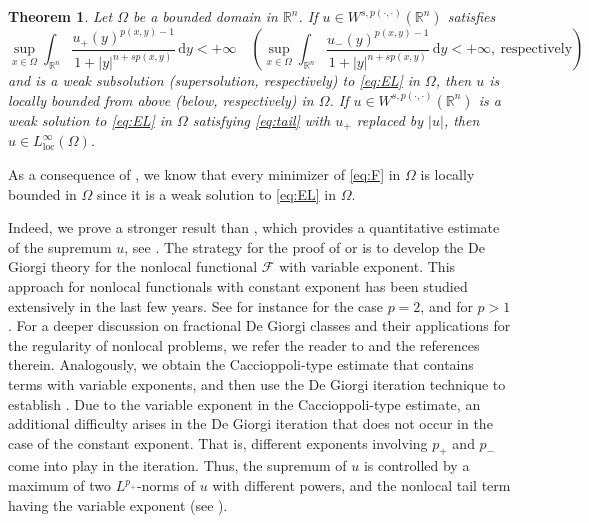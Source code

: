 \documentclass[11pt]{amsart}
\theoremstyle{plain}
\newtheorem{theorem}{Theorem}[section]
\theoremstyle{definition}
\numberwithin{equation}{section}
\begin{document}
\begin{theorem} \label{thm:local_boundedness}
Let $\Omega$ be a bounded domain in $\mathbb{R}^n$. If $u \in W^{s, p(\cdot,\cdot)}(\mathbb{R}^n)$ satisfies
\begin{equation} \label{eq:tail}
\sup_{x\in \Omega} \int_{\mathbb{R}^n} \frac{u_+(y)^{p(x,y)-1}}{1+|y|^{n+sp(x,y)}} \,\mathrm{d}y < +\infty \quad \left( \sup_{x\in \Omega} \int_{\mathbb{R}^n} \frac{u_-(y)^{p(x,y)-1}}{1+|y|^{n+sp(x,y)}} \,\mathrm{d}y < +\infty,~ \text{respectively} \right)
\end{equation}
and is a weak subsolution (supersolution, respectively) to \eqref{eq:EL} in $\Omega$, then $u$ is locally bounded from above (below, respectively) in $\Omega$. If $u \in W^{s, p(\cdot,\cdot)}(\mathbb{R}^n)$ is a weak solution to \eqref{eq:EL} in $\Omega$ satisfying \eqref{eq:tail} with $u_+$ replaced by $|u|$, then $u \in L^\infty_{\mathrm{loc}}(\Omega)$.
\end{theorem}

As a consequence of , we know that every minimizer of \eqref{eq:F} in $\Omega$ is locally bounded in $\Omega$ since it is a weak solution to \eqref{eq:EL} in $\Omega$.

Indeed, we prove a stronger result than , which provides a quantitative estimate of the supremum $u$, see . The strategy for the proof of  or  is to develop the De Giorgi theory for the nonlocal functional $\mathcal{F}$ with variable exponent. This approach for nonlocal functionals with constant exponent has been studied extensively in the last few years. See for instance \cite{Kas09,CCV11,FK13,KS14,DK20} for the case $p=2$, and \cite{DCKP14,DCKP16,BP16,KMS15,Coz17} for $p > 1$. For a deeper discussion on fractional De Giorgi classes and their applications for the regularity of nonlocal problems, we refer the reader to \cite{Coz19} and the references therein. Analogously, we obtain the Caccioppoli-type estimate that contains terms with variable exponents, and then use the De Giorgi iteration technique to establish . Due to the variable exponent in the Caccioppoli-type estimate, an additional difficulty arises in the De Giorgi iteration that does not occur in the case of the constant exponent. That is, different exponents involving $p_+$ and $p_-$ come into play in the iteration. Thus, the supremum of $u$ is controlled by a maximum of two $L^{p_+}$-norms of $u$ with different powers, and the nonlocal tail term having the variable exponent (see ).
\end{document}
